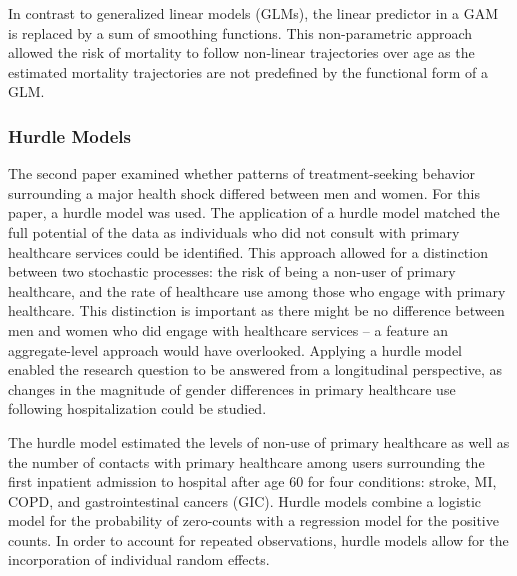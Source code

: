 In contrast to generalized linear models (GLMs), the linear predictor 
in a GAM is replaced by a sum of smoothing functions.\citep{hastie1986generalized,
hastie1995generalized} This non-parametric approach allowed the risk of 
mortality to follow non-linear trajectories over age as the estimated 
mortality trajectories are not predefined by the functional form of a 
GLM.\\


\subsubsection*{Hurdle Models}

The second paper examined whether patterns of treatment-seeking behavior 
surrounding a major health shock differed between men and women. For this 
paper, a hurdle model was used.\citep{min2005random,rose2006use,hu2011zero} 
The application of a hurdle model matched the full potential of the data as 
individuals who did not consult with primary healthcare services could be 
identified. This approach allowed for a distinction between two stochastic 
processes: the risk of being a non-user of primary healthcare, and the rate 
of healthcare use among those who engage with primary healthcare.\citep{gerdtham1997equity} 
This distinction is important as there might be no difference between men and 
women who did engage with healthcare services -- a feature an aggregate-level 
approach would have overlooked. Applying a hurdle model enabled the research 
question to be answered from a longitudinal perspective, as changes in the 
magnitude of gender differences in primary healthcare use following hospitalization 
could be studied.

The hurdle model estimated the levels of non-use of primary healthcare 
as well as the number of contacts with primary healthcare among users 
surrounding the first inpatient admission to hospital after age 60 for 
four conditions: stroke, MI, COPD, and gastrointestinal cancers (GIC). Hurdle 
models combine a logistic model for the probability of zero-counts with 
a regression model for the positive counts.\citep{min2005random} In order 
to account for repeated observations, hurdle models allow for the incorporation 
of individual random effects.\citep{min2005random} \\


